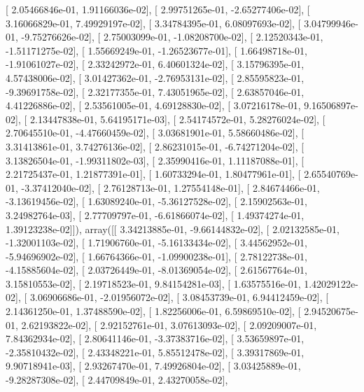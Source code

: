 \documentclass{article}
\begin{document}
       [  2.05466846e-01,   1.91166036e-02],
       [  2.99751265e-01,  -2.65277406e-02],
       [  3.16066829e-01,   7.49929197e-02],
       [  3.34784395e-01,   6.08097693e-02],
       [  3.04799946e-01,  -9.75276626e-02],
       [  2.75003099e-01,  -1.08208700e-02],
       [  2.12520343e-01,  -1.51171275e-02],
       [  1.55669249e-01,  -1.26523677e-01],
       [  1.66498718e-01,  -1.91061027e-02],
       [  2.33242972e-01,   6.40601324e-02],
       [  3.15796395e-01,   4.57438006e-02],
       [  3.01427362e-01,  -2.76953131e-02],
       [  2.85595823e-01,  -9.39691758e-02],
       [  2.32177355e-01,   7.43051965e-02],
       [  2.63857046e-01,   4.41226886e-02],
       [  2.53561005e-01,   4.69128830e-02],
       [  3.07216178e-01,   9.16506897e-02],
       [  2.13447838e-01,   5.64195171e-03],
       [  2.54174572e-01,   5.28276024e-02],
       [  2.70645510e-01,  -4.47660459e-02],
       [  3.03681901e-01,   5.58660486e-02],
       [  3.31413861e-01,   3.74276136e-02],
       [  2.86231015e-01,  -6.74271204e-02],
       [  3.13826504e-01,  -1.99311802e-03],
       [  2.35990416e-01,   1.11187088e-01],
       [  2.21725437e-01,   1.21877391e-01],
       [  1.60733294e-01,   1.80477961e-01],
       [  2.65540769e-01,  -3.37412040e-02],
       [  2.76128713e-01,   1.27554148e-01],
       [  2.84674466e-01,  -3.13619456e-02],
       [  1.63089240e-01,  -5.36127528e-02],
       [  2.15902563e-01,   3.24982764e-03],
       [  2.77709797e-01,  -6.61866074e-02],
       [  1.49374274e-01,   1.39123238e-02]]), array([[  3.34213885e-01,  -9.66144832e-02],
       [  2.02132585e-01,  -1.32001103e-02],
       [  1.71906760e-01,  -5.16133434e-02],
       [  3.44562952e-01,  -5.94696902e-02],
       [  1.66764366e-01,  -1.09900238e-01],
       [  2.78122738e-01,  -4.15885604e-02],
       [  2.03726449e-01,  -8.01369054e-02],
       [  2.61567764e-01,   3.15810553e-02],
       [  2.19718523e-01,   9.84154281e-03],
       [  1.63575516e-01,   1.42029122e-02],
       [  3.06906686e-01,  -2.01956072e-02],
       [  3.08453739e-01,   6.94412459e-02],
       [  2.14361250e-01,   1.37488590e-02],
       [  1.82256006e-01,   6.59869510e-02],
       [  2.94520675e-01,   2.62193822e-02],
       [  2.92152761e-01,   3.07613093e-02],
       [  2.09209007e-01,   7.84362934e-02],
       [  2.80641146e-01,  -3.37383716e-02],
       [  3.53659897e-01,  -2.35810432e-02],
       [  2.43348221e-01,   5.85512478e-02],
       [  3.39317869e-01,   9.90718941e-03],
       [  2.93267470e-01,   7.49926804e-02],
       [  3.03425889e-01,  -9.28287308e-02],
       [  2.44709849e-01,   2.43270058e-02],
\end{document}
